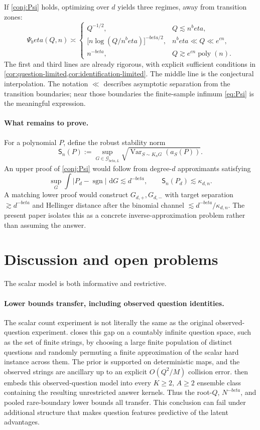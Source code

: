 \documentclass[11pt]{article}
\def\beta{beta}%
\newcommand{\sgn}{\operatorname{sgn}}
\newcommand{\Var}{\operatorname{Var}}
\newcommand{\calG}{\mathcal G}
\newcommand{\dd}{\,\mathrm d}
\begin{document}
If \cref{conj:Psi} holds, optimizing over $d$ yields three regimes, away from transition zones:
\begin{equation}
\label{eq:three-phase}
\Psi_\beta(Q,n)
\asymp
\begin{cases}
Q^{-1/2},
&Q\lesssim n^\beta,\\[1.2ex]
\bigl[n\log(Q/n^\beta)\bigr]^{-\beta/2},
&n^\beta\ll Q\ll e^{cn},\\[1.2ex]
n^{-\beta},
&Q\gtrsim e^{cn}\operatorname{poly}(n).
\end{cases}
\end{equation}
The first and third lines are already rigorous, with explicit sufficient conditions in \cref{cor:question-limited,cor:identification-limited}.  The middle line is the conjectural interpolation.  The notation $\ll$ describes asymptotic separation from the transition boundaries; near those boundaries the finite-sample infimum \eqref{eq:Psi} is the meaningful expression.

\paragraph{What remains to prove.}
For a polynomial $P$, define the robust stability norm
\[
\mathsf S_n(P)
:=
\sup_{G\in\calG_{\beta,L}}
\sqrt{\Var_{S\sim K_nG}(a_S(P))}.
\]
An upper proof of \cref{conj:Psi} would follow from degree-$d$ approximants satisfying
\[
\sup_G\int|P_d-\sgn|\,\dd G\lesssim d^{-\beta},
\qquad
\mathsf S_n(P_d)\lesssim\kappa_{d,n}.
\]
A matching lower proof would construct $G_{d,+},G_{d,-}$ with target separation $\gtrsim d^{-\beta}$ and Hellinger distance after the binomial channel $\lesssim d^{-\beta}/\kappa_{d,n}$.  The present paper isolates this as a concrete inverse-approximation problem rather than assuming the answer.

\section{Discussion and open problems}
\label{sec:back-general}

The scalar model is both informative and restrictive.

\paragraph{Lower bounds transfer, including observed question identities.}
The scalar count experiment is not literally the same as the original observed-question experiment.   closes this gap on a countably infinite question space, such as the set of finite strings, by choosing a large finite population of distinct questions and randomly permuting a finite approximation of the scalar hard instance across them.  The prior is supported on deterministic maps, and the observed strings are ancillary up to an explicit $O(Q^2/M)$ collision error.   then embeds this observed-question model into every $K\ge2$, $A\ge2$ ensemble class containing the resulting unrestricted answer kernels.  Thus the root-$Q$, $N^{-\beta}$, and pooled rare-boundary lower bounds all transfer.  This conclusion can fail under additional structure that makes question features predictive of the latent advantages.
\end{document}
